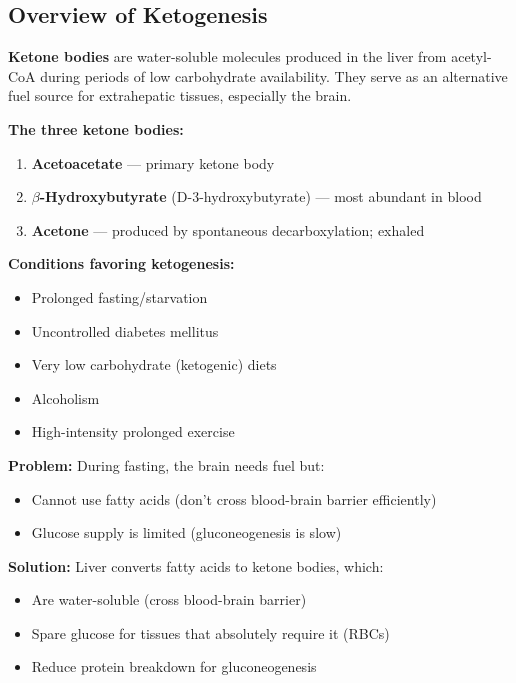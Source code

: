 \subsection{Overview of Ketogenesis}

\begin{definition}
\textbf{Ketone bodies} are water-soluble molecules produced in the liver from acetyl-CoA during periods of low carbohydrate availability. They serve as an alternative fuel source for extrahepatic tissues, especially the brain.
\end{definition}

\textbf{The three ketone bodies:}
\begin{enumerate}
    \item \textbf{Acetoacetate} — primary ketone body
    \item \textbf{$\beta$-Hydroxybutyrate} (D-3-hydroxybutyrate) — most abundant in blood
    \item \textbf{Acetone} — produced by spontaneous decarboxylation; exhaled
\end{enumerate}

\textbf{Conditions favoring ketogenesis:}
\begin{itemize}
    \item Prolonged fasting/starvation
    \item Uncontrolled diabetes mellitus
    \item Very low carbohydrate (ketogenic) diets
    \item Alcoholism
    \item High-intensity prolonged exercise
\end{itemize}

\begin{tcolorbox}[colback=blue!5, colframe=blue!70!black, title=\textbf{Why Ketone Bodies?}]
\textbf{Problem:} During fasting, the brain needs fuel but:
\begin{itemize}
    \item Cannot use fatty acids (don't cross blood-brain barrier efficiently)
    \item Glucose supply is limited (gluconeogenesis is slow)
\end{itemize}

\textbf{Solution:} Liver converts fatty acids to ketone bodies, which:
\begin{itemize}
    \item Are water-soluble (cross blood-brain barrier)
    \item Spare glucose for tissues that absolutely require it (RBCs)
    \item Reduce protein breakdown for gluconeogenesis
\end{itemize}
\end{tcolorbox}

